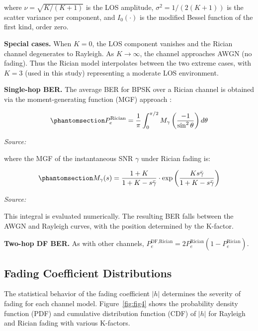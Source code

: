 where \(\nu = \sqrt{K/(K+1)}\) is the LOS amplitude, \(\sigma^2 = 1/(2(K+1))\) is the scatter variance per component, and \(I_0(\cdot)\) is the modified Bessel function of the first kind, order zero.

\textbf{Special cases.} When \(K = 0\), the LOS component vanishes and the Rician channel degenerates to Rayleigh. As \(K \to \infty\), the channel approaches AWGN (no fading). Thus the Rician model interpolates between the two extreme cases, with \(K=3\) (used in this study) representing a moderate LOS environment.

\textbf{Single-hop BER.} The average BER for BPSK over a Rician channel is obtained via the moment-generating function (MGF) approach \cite{simon2005digital}:

\begin{equation}\protect\phantomsection\label{eq:rician-ber-mgf}{P_e^{\text{Rician}} = \frac{1}{\pi} \int_0^{\pi/2} M_{\gamma}\left(\frac{-1}{\sin^2\theta}\right) d\theta
}\end{equation} \par{\small\textit{Source: \cite{simon2005digital}}}

where the MGF of the instantaneous SNR \(\gamma\) under Rician fading is:

\begin{equation}\protect\phantomsection\label{eq:rician-mgf}{M_{\gamma}(s) = \frac{1+K}{1+K - s\bar{\gamma}} \cdot \exp\left(\frac{Ks\bar{\gamma}}{1+K-s\bar{\gamma}}\right)
}\end{equation} \par{\small\textit{Source: \cite{simon2005digital}}}

This integral is evaluated numerically. The resulting BER falls between the AWGN and Rayleigh curves, with the position determined by the K-factor.

\textbf{Two-hop DF BER.} As with other channels, \(P_e^{\text{DF,Rician}} = 2P_e^{\text{Rician}}(1 - P_e^{\text{Rician}})\).


\subsection{Fading Coefficient Distributions}\label{sec:fading-coefficient-distributions}

The statistical behavior of the fading coefficient \(|h|\) determines the severity of fading for each channel model. Figure~\ref{fig:fig4} shows the probability density function (PDF) and cumulative distribution function (CDF) of \(|h|\) for Rayleigh and Rician fading with various K-factors.

